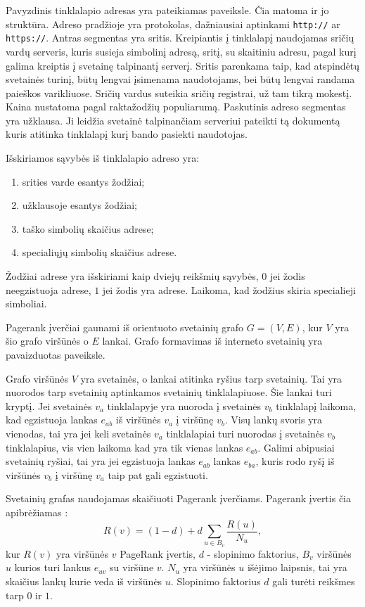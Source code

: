 Pavyzdinis tinklalapio adresas yra pateikiamas  paveiksle. Čia matoma ir jo struktūra. Adreso pradžioje yra protokolas, dažniausiai aptinkami \texttt{http://} ar \texttt{https://}. Antras segmentas yra sritis. Kreipiantis į tinklalapį naudojamas sričių vardų serveris, kuris susieja simbolinį adresą, sritį, su skaitiniu adresu, pagal kurį galima kreiptis į svetainę talpinantį serverį. Sritis parenkama taip, kad atspindėtų svetainės turinį, būtų lengvai įsimenama naudotojams, bei būtų lengvai randama paieškos varikliuose. Sričių vardus suteikia sričių registrai, už tam tikrą mokestį. Kaina nustatoma pagal raktažodžių populiarumą. Paskutinis adreso segmentas yra užklausa. Ji leidžia svetainė talpinančiam serveriui pateikti tą dokumentą kuris atitinka tinklalapį kurį bando pasiekti naudotojas.

Išskiriamos sąvybės iš tinklalapio adreso yra:
\begin{enumerate}
\item srities varde esantys žodžiai;
\item užklausoje esantys žodžiai;
\item taško simbolių skaičius adrese;
\item specialiųjų simbolių skaičius adrese.
\end{enumerate}
Žodžiai adrese yra išskiriami kaip dviejų reikšmių sąvybės, $0$ jei žodis neegzistuoja adrese, $1$ jei žodis yra adrese. Laikoma, kad žodžius skiria specialieji simboliai.

Pagerank įverčiai gaunami iš orientuoto svetainių grafo $G = (V, E)$, kur $V$ yra šio grafo viršūnės o $E$ lankai. Grafo formavimas iš interneto svetainių yra pavaizduotas  paveiksle.

Grafo viršūnės $V$ yra svetainės, o lankai atitinka ryšius tarp svetainių. Tai yra nuorodos tarp svetainių aptinkamos svetainių tinklalapiuose. Šie lankai turi kryptį. Jei svetainės $v_a$ tinklalapyje yra nuoroda į svetainės $v_b$ tinklalapį laikoma, kad egzistuoja lankas $e_{ab}$ iš viršūnės $v_a$ į viršūnę $v_b$. Visų lankų svoris yra vienodas, tai yra jei keli svetainės $v_a$ tinklalapiai turi nuorodas į svetainės $v_b$ tinklalapius, vis vien laikoma kad yra tik vienas lankas $e_{ab}$. Galimi abipusiai svetainių ryšiai, tai yra jei egzistuoja lankas $e_{ab}$ lankas $e_{ba}$, kuris rodo ryšį iš viršūnės $v_b$ į viršūnę $v_a$ taip pat gali egzistuoti.

Svetainių grafas naudojamas skaičiuoti Pagerank įverčiams. Pagerank įvertis čia apibrėžiamas \cite{pagerank}:
\begin{equation} \label{eq:pagerank}
    R(v) = (1 - d) + d \sum_{u \in B_{v}} \frac{R(u)}{N_u},
\end{equation}
kur $R(v)$ yra viršūnės $v$ PageRank įvertis, $d$ - slopinimo faktorius, $B_v$ viršūnės $u$ kurios turi lankus $e_{uv}$ su viršūne $v$. $N_u$ yra viršūnės $u$ išėjimo laipsnis, tai yra skaičius lankų kurie veda iš viršūnės $u$. Slopinimo faktorius $d$ gali turėti reikšmes tarp $0$ ir $1$.

